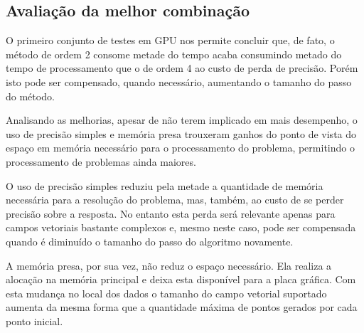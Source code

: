   
  \subsection{Avaliação da melhor combinação}
  O primeiro conjunto de testes em GPU nos permite concluir que, de fato, o método de ordem 2 consome metade do tempo acaba consumindo metado do tempo de processamento que o de ordem 4 ao custo de perda de precisão. Porém isto pode ser compensado, quando necessário, aumentando o tamanho do passo do método.
  
  Analisando as melhorias, apesar de  não terem implicado em mais desempenho, o uso de precisão simples e memória presa trouxeram ganhos do ponto de vista do espaço em memória necessário para o processamento do problema, permitindo o processamento de problemas ainda maiores.
  
  O uso de precisão simples reduziu pela metade a quantidade de memória necessária para a resolução do problema, mas, também, ao custo de se perder precisão sobre a resposta. No entanto esta perda será relevante apenas para campos vetoriais bastante complexos e, mesmo neste caso, pode ser compensada quando é diminuído o tamanho do passo do algoritmo novamente.
  
  A memória presa, por sua vez, não reduz o espaço necessário. Ela realiza a alocação na memória principal e deixa esta disponível para a placa gráfica. Com esta mudança no local dos dados o tamanho do campo vetorial suportado aumenta da mesma forma que a quantidade máxima de pontos gerados por cada ponto inicial.
